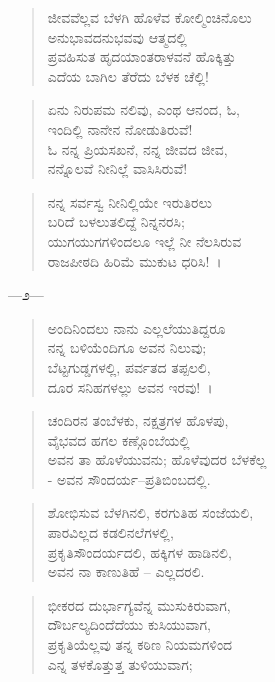 \begin{verse}
ಜೀವವೆಲ್ಲವ ಬೆಳಗಿ ಹೊಳೆವ ಕೋಲ್ಮಿಂಚಿನೊಲು\\ಅನುಭಾವದನುಭವವು ಆತ್ಮದಲ್ಲಿ\\ಪ್ರವಹಿಸುತ ಹೃದಯಾಂತರಾಳವನೆ ಹೊಕ್ಕಿತ್ತು\\ಎದೆಯ ಬಾಗಿಲ ತೆರೆದು ಬೆಳಕ ಚೆಲ್ಲಿ! 
\end{verse}

\begin{verse}
ಏನು ನಿರುಪಮ ನಲಿವು, ಎಂಥ ಆನಂದ, ಓ,\\ಇಂದಿಲ್ಲಿ ನಾನೇನ ನೋಡುತಿರುವೆ!\\ಓ ನನ್ನ ಪ್ರಿಯಸಖನೆ, ನನ್ನ ಜೀವದ ಜೀವ,\\ನನ್ನೊಲವೆ ನೀನಿಲ್ಲೆ ವಾಸಿಸಿರುವೆ!
\end{verse}

\begin{verse}
ನನ್ನ ಸರ್ವಸ್ವ ನೀನಿಲ್ಲಿಯೇ ಇರುತಿರಲು\\ಬರಿದೆ ಬಳಲುತಲಿದ್ದೆ ನಿನ್ನನರಸಿ;\\ಯುಗಯುಗಗಳಿಂದಲೂ ಇಲ್ಲೆ ನೀ ನೆಲಸಿರುವ\\ರಾಜಪೀಠದಿ ಹಿರಿಮೆ ಮುಕುಟ ಧರಿಸಿ!~।
\end{verse}

\begin{center}
—೨—
\end{center}

\begin{verse}
ಅಂದಿನಿಂದಲು ನಾನು ಎಲ್ಲಲೆಯುತಿದ್ದರೂ\\ನನ್ನ ಬಳಿಯೆಂದಿಗೂ ಅವನ ನಿಲುವು; \\ಬೆಟ್ಟಗುಡ್ಡಗಳಲ್ಲಿ, ಪರ್ವತದ ತಪ್ಪಲಲಿ,\\ದೂರ ಸನಿಹಗಳಲ್ಲು ಅವನ ಇರವು!~।
\end{verse}

\begin{verse}
ಚಂದಿರನ ತಂಬೆಳಕು, ನಕ್ಷತ್ರಗಳ ಹೊಳಪು,\\ವೈಭವದ ಹಗಲ ಕಣ್ಗೊಂಬೆಯಲ್ಲಿ\\ಅವನ ತಾ ಹೊಳೆಯುವನು; ಹೊಳೆವುದರ ಬೆಳಕೆಲ್ಲ\\- ಅವನ ಸೌಂದರ್ಯ–ಪ್ರತಿಬಿಂಬದಲ್ಲಿ.
\end{verse}

\begin{verse}
ಶೋಭಿಸುವ ಬೆಳಗಿನಲಿ, ಕರಗುತಿಹ ಸಂಜೆಯಲಿ,\\ಪಾರವಿಲ್ಲದ ಕಡಲಿನಲೆಗಳಲ್ಲಿ,\\ಪ್ರಕೃತಿಸೌಂದರ್ಯದಲಿ, ಹಕ್ಕಿಗಳ ಹಾಡಿನಲಿ,\\ಅವನ ನಾ ಕಾಣುತಿಹೆ – ಎಲ್ಲದರಲಿ. 
\end{verse}

\begin{verse}
ಭೀಕರದ ದುರ್ಭಾಗ್ಯವೆನ್ನ ಮುಸುಕಿರುವಾಗ,\\ದೌರ್ಬಲ್ಯದಿಂದೆದೆಯು ಕುಸಿಯುವಾಗ,\\ಪ್ರಕೃತಿಯೆಲ್ಲವು ತನ್ನ ಕಠಿಣ ನಿಯಮಗಳಿಂದ\\ಎನ್ನ ತಳಕೊತ್ತುತ್ತ ತುಳಿಯುವಾಗ;
\end{verse}

